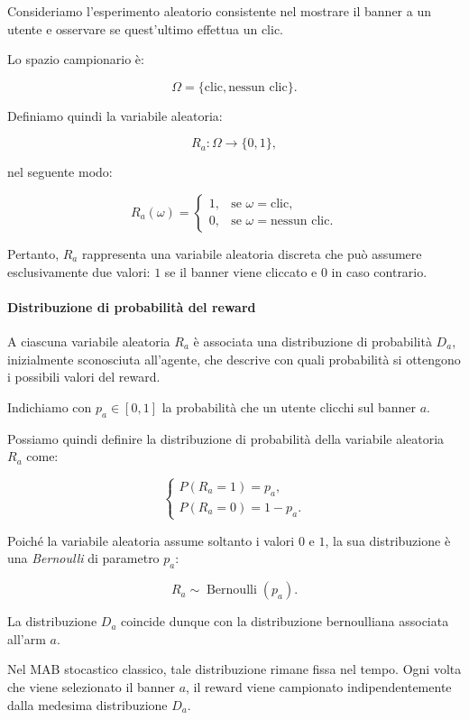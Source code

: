Consideriamo l'esperimento aleatorio consistente nel mostrare il banner a un utente e osservare se quest'ultimo effettua un clic.

Lo spazio campionario è:

\[
\Omega = \{\text{clic},\text{nessun clic}\}.
\]

Definiamo quindi la variabile aleatoria:

\[
R_a : \Omega \longrightarrow \{0,1\},
\]

nel seguente modo:

\[
R_a(\omega) =
\begin{cases}
1, & \text{se } \omega = \text{clic},\\
0, & \text{se } \omega = \text{nessun clic}.
\end{cases}
\]

Pertanto, $R_a$ rappresenta una variabile aleatoria discreta che può assumere esclusivamente due valori: $1$ se il banner viene cliccato e $0$ in caso contrario.

\paragraph{Distribuzione di probabilità del reward}

A ciascuna variabile aleatoria $R_a$ è associata una distribuzione di probabilità $D_a$, inizialmente sconosciuta all'agente, che descrive con quali probabilità si ottengono i possibili valori del reward.

Indichiamo con $p_a \in [0,1]$ la probabilità che un utente clicchi sul banner $a$.

Possiamo quindi definire la distribuzione di probabilità della variabile aleatoria $R_a$ come:

\[
\begin{cases}
P(R_a = 1) = p_a,\\
P(R_a = 0) = 1-p_a.
\end{cases}
\]

Poiché la variabile aleatoria assume soltanto i valori $0$ e $1$, la sua distribuzione è una \textit{Bernoulli} di parametro $p_a$:

\[
\boxed{R_a \sim \operatorname{Bernoulli}(p_a).}
\]

La distribuzione $D_a$ coincide dunque con la distribuzione bernoulliana associata all'arm $a$.

Nel MAB stocastico classico, tale distribuzione rimane fissa nel tempo. Ogni volta che viene selezionato il banner $a$, il reward viene campionato indipendentemente dalla medesima distribuzione $D_a$.

